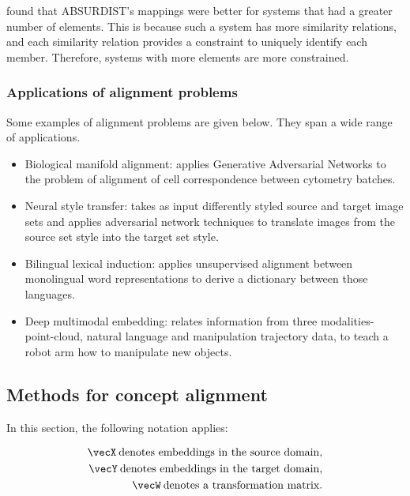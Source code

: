 \cite{GOLDSTONE2002295} found that ABSURDIST's mappings were better for systems that had a greater number of elements. This is because such a system has more similarity relations, and each similarity relation provides a constraint to uniquely identify each member. Therefore, systems with more elements are more constrained. 

\subsubsection{Applications of alignment problems}

Some examples of alignment problems are given below. They span a wide range of applications. 

\begin{itemize}
    \item Biological manifold alignment: \cite{magan} applies Generative Adversarial Networks \cite{GAN} to the problem of alignment of cell correspondence between cytometry batches.
    \item Neural style transfer: \cite{CycleGAN} takes as input differently styled source and target image sets and applies adversarial network techniques to translate images from the source set style into the target set style. 
    \item Bilingual lexical induction: \cite{wordtranslationwithoutparalleldata} applies unsupervised alignment between monolingual word representations to derive a dictionary between those languages.
    \item Deep multimodal embedding: \cite{DeepMultimodalEmbedding} relates information from three modalities- point-cloud, natural language and manipulation trajectory data, to teach a robot arm  how to manipulate new objects. 
\end{itemize}

\subsection{Methods for concept alignment}

In this section, the following notation applies:

\begin{equation}
\begin{split}
    \vecX \medspace \text{denotes embeddings in the source domain},\\
    \vecY \medspace \text{denotes embeddings in the target domain},\\
    \vecW \medspace \text{denotes a transformation matrix}.\\
\end{split}
\end{equation}

